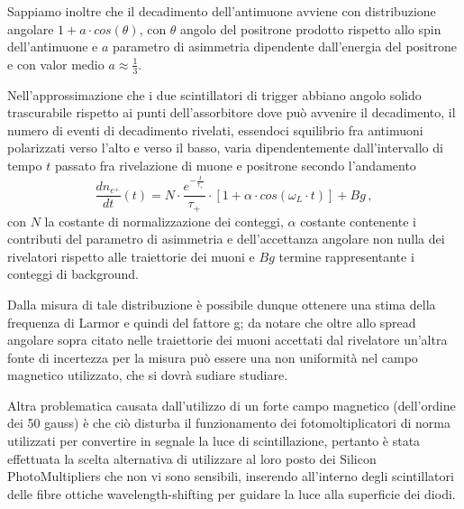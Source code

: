 Sappiamo inoltre che il decadimento dell'antimuone avviene con distribuzione angolare $1+a \cdot cos(\theta)$, con $\theta$ angolo del positrone prodotto rispetto allo spin dell'antimuone e $a$ parametro di asimmetria dipendente dall'energia del positrone e con valor medio $a\approx\frac{1}{3}$. \cite{bib:AJP-Amsler} \par
Nell'approssimazione che i due scintillatori di trigger abbiano angolo solido trascurabile rispetto ai punti dell'assorbitore dove può avvenire il decadimento, il numero di eventi di decadimento rivelati, essendoci squilibrio fra antimuoni polarizzati verso l'alto e verso il basso, varia dipendentemente dall'intervallo di tempo $t$ passato fra rivelazione di muone e positrone secondo l'andamento
\begin{equation}
\frac{dn_{e^+}}{dt}(t)=N \cdot\frac{e^{-\frac{t}{\tau_+}}}{\tau_+}\cdot[1+\alpha\cdot cos(\omega_L \cdot t)]+Bg \, ,
\end{equation}
con $N$ la costante di normalizzazione dei conteggi, $\alpha$ costante contenente i contributi del parametro di asimmetria e dell'accettanza angolare non nulla dei rivelatori rispetto alle traiettorie dei muoni e $Bg$ termine rappresentante i conteggi di background. \par
Dalla misura di tale distribuzione è possibile dunque ottenere una stima della frequenza di Larmor e quindi del fattore g; da notare che oltre allo spread angolare sopra citato nelle traiettorie dei muoni accettati dal rivelatore un'altra fonte di incertezza per la misura può essere una non uniformità nel campo magnetico utilizzato, che si dovrà sudiare studiare. \par
Altra problematica causata dall'utilizzo di un forte campo magnetico (dell'ordine dei 50 gauss) è che ciò disturba il funzionamento dei fotomoltiplicatori di norma utilizzati per convertire in segnale la luce di scintillazione, pertanto è stata effettuata la scelta alternativa di utilizzare al loro posto dei Silicon PhotoMultipliers che non vi sono sensibili, inserendo all'interno degli scintillatori delle fibre ottiche wavelength-shifting per guidare la luce alla superficie dei diodi.
